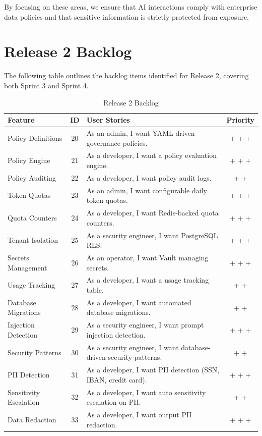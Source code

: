 By focusing on these areas, we ensure that AI interactions comply with enterprise data policies and that sensitive information is strictly protected from exposure.

\section{Release 2 Backlog}

The following table outlines the backlog items identified for Release 2, covering both Sprint 3 and Sprint 4.

\begin{table}[H]
\centering
\renewcommand{\arraystretch}{1.3}
\footnotesize
\begin{tabularx}{\textwidth}{| >{\raggedright\arraybackslash}p{3.5cm} | c | >{\raggedright\arraybackslash}X | c |}
\hline
\rowcolor{rowgray}
\textbf{Feature} & \textbf{ID} & \textbf{User Stories} & \textbf{Priority} \\
\hline
Policy Definitions & 20 & As an admin, I want YAML-driven governance policies. & + + + \\
\hline
Policy Engine & 21 & As a developer, I want a policy evaluation engine. & + + + \\
\hline
Policy Auditing & 22 & As a developer, I want policy audit logs. & + + \\
\hline
Token Quotas & 23 & As an admin, I want configurable daily token quotas. & + + + \\
\hline
Quota Counters & 24 & As a developer, I want Redis-backed quota counters. & + + + \\
\hline
Tenant Isolation & 25 & As a security engineer, I want PostgreSQL RLS. & + + + \\
\hline
Secrets Management & 26 & As an operator, I want Vault managing secrets. & + + + \\
\hline
Usage Tracking & 27 & As a developer, I want a usage tracking table. & + + \\
\hline
Database Migrations & 28 & As a developer, I want automated database migrations. & + + \\
\hline
Injection Detection & 29 & As a security engineer, I want prompt injection detection. & + + + \\
\hline
Security Patterns & 30 & As a security engineer, I want database-driven security patterns. & + + \\
\hline
PII Detection & 31 & As a developer, I want PII detection (SSN, IBAN, credit card). & + + + \\
\hline
Sensitivity Escalation & 32 & As a developer, I want auto sensitivity escalation on PII. & + + \\
\hline
Data Redaction & 33 & As a developer, I want output PII redaction. & + + + \\
\hline
\end{tabularx}
\caption{Release 2 Backlog}
\label{tab:release2_backlog}
\end{table}


